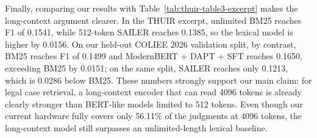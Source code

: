Finally, comparing our results with Table~\ref{tab:thuir-table3-excerpt} makes the long-context argument clearer. In the THUIR excerpt, unlimited BM25 reaches F1 of 0.1541, while 512-token SAILER reaches 0.1385, so the lexical model is higher by 0.0156. On our held-out COLIEE 2026 validation split, by contrast, BM25 reaches F1 of 0.1499 and ModernBERT + DAPT + SFT reaches 0.1650, exceeding BM25 by 0.0151; on the same split, SAILER reaches only 0.1213, which is 0.0286 below BM25. These numbers strongly support our main claim: for legal case retrieval, a long-context encoder that can read 4096 tokens is already clearly stronger than BERT-like models limited to 512 tokens. Even though our current hardware fully covers only 56.11\% of the judgments at 4096 tokens, the long-context model still surpasses an unlimited-length lexical baseline.
